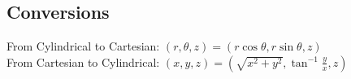 \subsection{Conversions}
\noindent
From Cylindrical to Cartesian: $(r,\theta,z)=(r\cos{\theta},r\sin{\theta},z)$\\
From Cartesian to Cylindrical: $(x,y,z)=\left(\sqrt{x^2+y^2},\tan^{-1}{\frac{y}{x}},z\right)$\\
